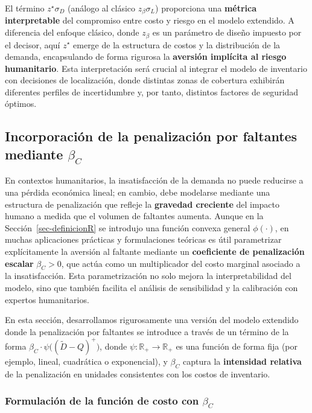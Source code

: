 \documentclass[
  spanish,
  us-letterpaper,
]{scrreprt}
\numberwithin{equation}{section}
\begin{document}
El término \(z^\star \sigma_D\) (análogo al clásico
\(z_\beta \sigma_L\)) proporciona una \textbf{métrica interpretable} del
compromiso entre costo y riesgo en el modelo extendido. A diferencia del
enfoque clásico, donde \(z_\beta\) es un parámetro de diseño impuesto
por el decisor, aquí \(z^\star\) emerge de la estructura de costos y la
distribución de la demanda, encapsulando de forma rigurosa la
\textbf{aversión implícita al riesgo humanitario}. Esta interpretación
será crucial al integrar el modelo de inventario con decisiones de
localización, donde distintas zonas de cobertura exhibirán diferentes
perfiles de incertidumbre y, por tanto, distintos factores de seguridad
óptimos.

\subsection{\texorpdfstring{Incorporación de la penalización por
faltantes mediante
\(\beta_C\)}{Incorporación de la penalización por faltantes mediante \textbackslash beta\_C}}\label{incorporaciuxf3n-de-la-penalizaciuxf3n-por-faltantes-mediante-beta_c}

En contextos humanitarios, la insatisfacción de la demanda no puede
reducirse a una pérdida económica lineal; en cambio, debe modelarse
mediante una estructura de penalización que refleje la \textbf{gravedad
creciente} del impacto humano a medida que el volumen de faltantes
aumenta. Aunque en la Sección~\ref{sec-definicionR} se introdujo una
función convexa general \(\phi(\cdot)\), en muchas aplicaciones
prácticas y formulaciones teóricas es útil parametrizar explícitamente
la aversión al faltante mediante un \textbf{coeficiente de penalización
escalar} \(\beta_C > 0\), que actúa como un multiplicador del costo
marginal asociado a la insatisfacción. Esta parametrización no solo
mejora la interpretabilidad del modelo, sino que también facilita el
análisis de sensibilidad y la calibración con expertos humanitarios.

En esta sección, desarrollamos rigurosamente una versión del modelo
extendido donde la penalización por faltantes se introduce a través de
un término de la forma
\(\beta_C \cdot \psi\big((\tilde{D} - Q)^+\big)\), donde
\(\psi: \mathbb{R}_+ \to \mathbb{R}_+\) es una función de forma fija
(por ejemplo, lineal, cuadrática o exponencial), y \(\beta_C\) captura
la \textbf{intensidad relativa} de la penalización en unidades
consistentes con los costos de inventario.

\subsubsection{\texorpdfstring{Formulación de la función de costo con
\(\beta_C\)}{Formulación de la función de costo con \textbackslash beta\_C}}\label{formulaciuxf3n-de-la-funciuxf3n-de-costo-con-beta_c}
\end{document}
